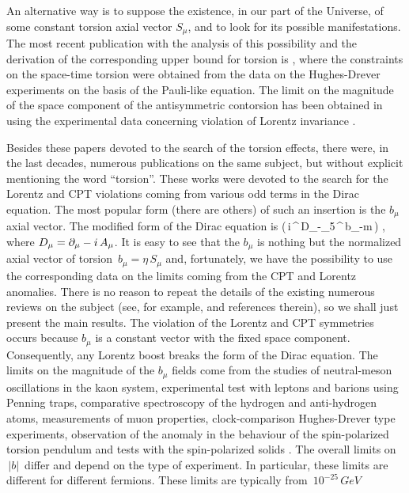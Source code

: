 An alternative way is to suppose the existence, in our part of the
Universe, of some constant torsion axial vector $S_\mu$, and to
look for its possible manifestations. The most
recent publication with the analysis of this possibility and the
derivation of the corresponding upper bound for torsion is
\cite{lamme}, where the constraints on the space-time torsion
were obtained from the data on the Hughes-Drever experiments
on the basis of the Pauli-like equation. 
The limit on the magnitude of the space component
of the antisymmetric contorsion has been obtained
in \cite{lamme} using the experimental data 
concerning violation of Lorentz invariance \cite{chupp}.

Besides these papers devoted to the search of the torsion effects,
there were, in the last decades, numerous publications on the same
subject, but without explicit mentioning the word ``torsion''. 
These works were devoted to the search for the Lorentz
and CPT violations coming from various odd terms in the Dirac
equation. The most popular form (there are others) of such an
insertion is the $b_\mu$ axial vector. The modified form of the
Dirac equation is
\beq
\Big(\,i\,\ga^\mu\,D_\mu-\ga_5\,\ga^\mu\,b_\mu-m\,\Big)\,\,,
\label{b-field}
\eeq
where $D_\mu =\partial_\mu - i\,A_\mu$. It is easy to see that the
$b_\mu$ is nothing but the normalized axial vector of torsion
$\,b_\mu=\eta\,S_\mu$ and, fortunately, we have the possibility
to use the corresponding data on the limits coming from the
CPT and Lorentz anomalies. There is no reason to repeat the
details of the existing numerous reviews on the subject (see, 
for example, \cite{bluhm,kosto} and references therein),
so we shall just present the main results.
The violation of the Lorentz and CPT symmetries occurs because
$b_\mu$ is a constant vector with the fixed space component.
Consequently, any Lorentz boost breaks the form of the Dirac
equation. The limits on the magnitude of the $b_\mu$ fields
come from the studies of
neutral-meson oscillations in the kaon system,
experimental test with leptons and barions using Penning traps,
comparative spectroscopy of the hydrogen and
anti-hydrogen atoms, measurements of muon properties,
clock-comparison Hughes-Drever type experiments, 
observation of the anomaly in the behaviour of the spin-polarized
torsion pendulum and tests with the spin-polarized solids
\cite{blukos}. The overall limits on $\,\left|b\right|\,$
differ and depend on the type of experiment. In particular, these
limits are different for different fermions. 
These limits are typically from $\,10^{-25}\,GeV$
